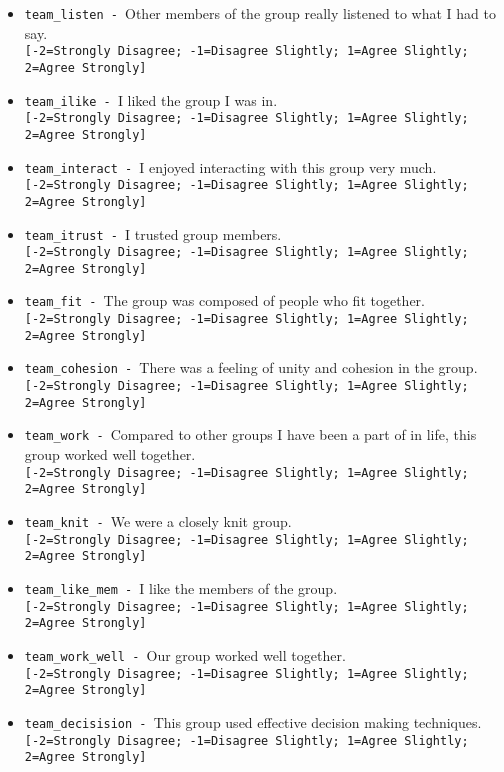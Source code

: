 \begin{description}
\begin{addmargin}[0em]{0em}
\begin{addmargin}[1em]{0em}
\begin{itemize}
            \item \verb|team_listen - |Other members of the group really listened to what I had to say.\\\verb|[-2=Strongly Disagree; -1=Disagree Slightly; 1=Agree Slightly; 2=Agree Strongly]|
            \item \verb|team_ilike - |I liked the group I was in.\\\verb|[-2=Strongly Disagree; -1=Disagree Slightly; 1=Agree Slightly; 2=Agree Strongly]|
            \item \verb|team_interact - |I enjoyed interacting with this group very much.\\\verb|[-2=Strongly Disagree; -1=Disagree Slightly; 1=Agree Slightly; 2=Agree Strongly]|
            \item \verb|team_itrust - |I trusted group members.\\\verb|[-2=Strongly Disagree; -1=Disagree Slightly; 1=Agree Slightly; 2=Agree Strongly]|
            \item \verb|team_fit - |The group was composed of people who fit together.\\\verb|[-2=Strongly Disagree; -1=Disagree Slightly; 1=Agree Slightly; 2=Agree Strongly]|
            \item \verb|team_cohesion - |There was a feeling of unity and cohesion in the group.\\\verb|[-2=Strongly Disagree; -1=Disagree Slightly; 1=Agree Slightly; 2=Agree Strongly]|
            \item \verb|team_work - |Compared to other groups I have been a part of in life, this group worked well together.\\\verb|[-2=Strongly Disagree; -1=Disagree Slightly; 1=Agree Slightly; 2=Agree Strongly]|
            \item \verb|team_knit - |We were a closely knit group.\\\verb|[-2=Strongly Disagree; -1=Disagree Slightly; 1=Agree Slightly; 2=Agree Strongly]|
            \item \verb|team_like_mem - |I like the members of the group.\\\verb|[-2=Strongly Disagree; -1=Disagree Slightly; 1=Agree Slightly; 2=Agree Strongly]|
            \item \verb|team_work_well - |Our group worked well together.\\\verb|[-2=Strongly Disagree; -1=Disagree Slightly; 1=Agree Slightly; 2=Agree Strongly]|
            \item \verb|team_decisision - |This group used effective decision making techniques.\\\verb|[-2=Strongly Disagree; -1=Disagree Slightly; 1=Agree Slightly; 2=Agree Strongly]|

\end{itemize}
\end{addmargin}
\end{addmargin}
\end{description}
